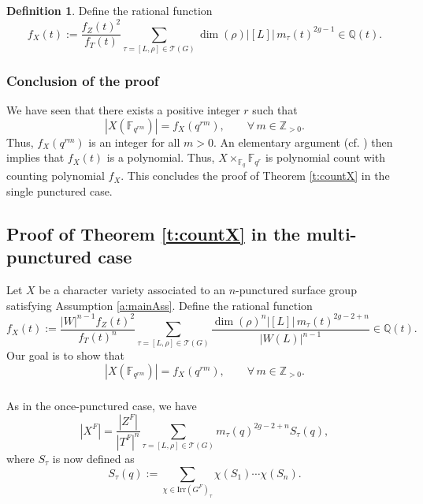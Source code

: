 \documentclass[12pt]{amsart}
\theoremstyle{plain}
\theoremstyle{definition}
\newtheorem{defe}[thm]{Definition}
\theoremstyle{remark}
\newcommand{\bX}{{X}}
\newcommand{\cT}{\mathcal{T}}
\newcommand{\Irr}{\mathrm{Irr}}
\newcommand{\Fq}{\mathbb{F}_q}
\begin{document}
 \begin{defe} 
Define the rational function 
\[
f_X(t):=\frac{f_Z(t)^2}{f_T(t)} \sum_{\tau=[L, \rho]\in \cT(G)} \dim(\rho) |[L]| \,m_\tau(t)^{2g-1}\in \mathbb{Q}(t). 
\]
\end{defe} 

\subsubsection{Conclusion of the proof} We have seen that there exists a positive integer $r$ such that  
\[
|X(\mathbb{F}_{q^{rm}})| = f_X(q^{rm}),\qquad \forall \, m\in \mathbb{Z}_{>0}. 
\]
Thus, $f_X(q^{rm})$ is an integer for all $m>0$. An elementary argument (cf.  \cite[Lemma 2.11]{GoodwinRohrle}) then implies that $f_X(t)$ is a polynomial. Thus, $X\times_{\Fq} \mathbb{F}_{q^r}$ is polynomial count with counting polynomial $f_X$. This concludes the proof of Theorem \ref{t:countX} in the single punctured case.  
\qedhere 
 
 
 



\subsection{Proof of Theorem \ref{t:countX} in the multi-punctured case} \label{s:countXPrecise} Let $\bX$ be a character variety associated to an $n$-punctured surface group satisfying Assumption \ref{a:mainAss}. Define the rational function 
\begin{equation} \label{eq:f_X}
f_X(t):=\frac{|W|^{n-1} f_Z(t)^2}{f_T(t)^n} \sum_{\tau=[L, \rho]\in \cT(G)} \frac{\dim(\rho)^n  |[L]| \,m_\tau(t)^{2g-2+n}}{|W(L)|^{n-1}}\in \mathbb{Q}(t). 
\end{equation} 
Our goal is to show that  
\[
|X(\mathbb{F}_{q^{rm}})| = f_X(q^{rm}),\qquad \forall \, m\in \mathbb{Z}_{>0}. 
\]

\subsubsection{} 
As in the once-punctured case, we have
\[
|X^F| = \frac{|Z^F|}{|T^F|^n} \sum_{\tau=[L,\rho]\in\cT(G)} m_\tau(q)^{2g-2+n} S_\tau(q),
\]
where $S_\tau$ is now defined as
\[
S_\tau(q) := \sum_{\chi\in\Irr(G^F)_\tau} \chi(S_1)\cdots\chi(S_n).
\]
\end{document}
